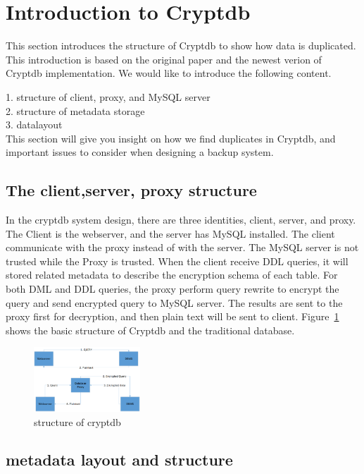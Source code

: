 \section{Introduction to Cryptdb}

This section introduces the structure of Cryptdb to show how data is duplicated. This introduction is based on the original paper and the newest verion of Cryptdb implementation. We would like to introduce the following content.

1. structure of client, proxy, and MySQL server\\
2. structure of metadata storage\\
3. datalayout \\

This section will give you insight on how we find duplicates in Cryptdb, and important issues to consider when designing a backup system.

\subsection{The client,server, proxy structure}

In the cryptdb system design, there are three identities, client, server, and proxy. The Client is the webserver, and the server has MySQL installed. The client communicate with the proxy instead of with the server. The MySQL server is not trusted while the Proxy is trusted. When the client receive DDL queries, it will stored related metadata to describe the encryption schema of each table. For both DML and DDL queries, the proxy perform query rewrite to encrypt the query and send encrypted query to MySQL server. The results are sent to the proxy first for decryption, and then plain text will be sent to client. Figure~\ref{fig:stack1} shows the basic structure of Cryptdb and the traditional database. 


\begin{figure}[tb]
\centering
\includegraphics[width=4cm]{images/Cryptdb.png}
\caption{structure of cryptdb}
\label{fig:stack1}
\end{figure}



\subsection{metadata layout and structure}

